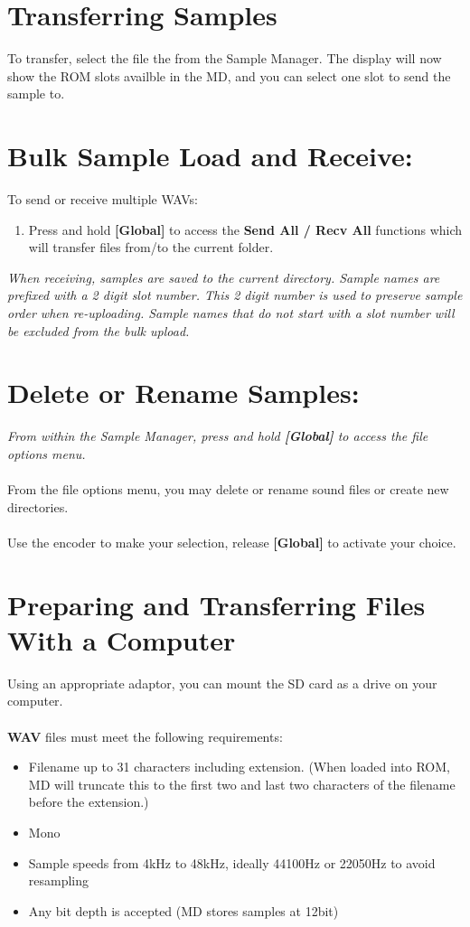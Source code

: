 \section{Transferring Samples}
To transfer, select the file the from the Sample Manager. The display will now show the ROM slots availble in the MD, and you can select one slot to send the sample to.
\section{Bulk Sample Load and Receive:}
To send or receive multiple WAVs:
\begin{enumerate}
\item Press and hold \textbf{[Global]} to access the \textbf{Send All / Recv All} functions which will transfer files from/to the current folder.
\end{enumerate}
\textit{When receiving, samples are saved to the current directory. Sample names are prefixed with a 2 digit slot number. This 2 digit number is used to preserve sample order when re-uploading. Sample names that do not start with a slot number will be excluded from the bulk upload.}
\newpage
\section{Delete or Rename Samples:}
\textit{From within the Sample Manager, press and hold \textbf{[Global]} to access the file options menu.}\\\\
From the file options menu, you may delete or rename sound files or create new directories.\\\\
Use the encoder to make your selection, release \textbf{[Global]} to activate your choice.
\section{Preparing and Transferring Files With a Computer}
Using an appropriate adaptor, you can mount the SD card as a drive on your computer. \\
\\
\textbf{WAV} files must meet the following requirements:
\begin{itemize}
    \item Filename up to 31 characters including extension. (When loaded into ROM, MD will truncate this to the first two and last two characters of the filename before the extension.)
    \item Mono
    \item Sample speeds from 4kHz to 48kHz, ideally 44100Hz or 22050Hz to avoid resampling
    \item Any bit depth is accepted (MD stores samples at 12bit)
\end{itemize}